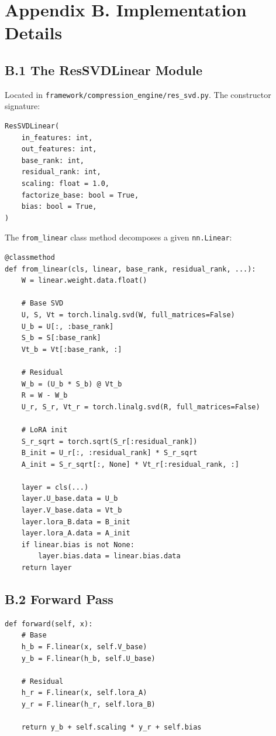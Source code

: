 \section{Appendix B. Implementation Details}

\subsection{B.1 The ResSVDLinear Module}

Located in \texttt{framework/compression\_engine/res\_svd.py}. The constructor 
signature:

\begin{lstlisting}
ResSVDLinear(
    in_features: int,
    out_features: int,
    base_rank: int,
    residual_rank: int,
    scaling: float = 1.0,
    factorize_base: bool = True,
    bias: bool = True,
)
\end{lstlisting}

The \texttt{from\_linear} class method decomposes a given \texttt{nn.Linear}:

\begin{lstlisting}
@classmethod
def from_linear(cls, linear, base_rank, residual_rank, ...):
    W = linear.weight.data.float()
    
    # Base SVD
    U, S, Vt = torch.linalg.svd(W, full_matrices=False)
    U_b = U[:, :base_rank]
    S_b = S[:base_rank]
    Vt_b = Vt[:base_rank, :]
    
    # Residual
    W_b = (U_b * S_b) @ Vt_b
    R = W - W_b
    U_r, S_r, Vt_r = torch.linalg.svd(R, full_matrices=False)
    
    # LoRA init
    S_r_sqrt = torch.sqrt(S_r[:residual_rank])
    B_init = U_r[:, :residual_rank] * S_r_sqrt
    A_init = S_r_sqrt[:, None] * Vt_r[:residual_rank, :]
    
    layer = cls(...)
    layer.U_base.data = U_b
    layer.V_base.data = Vt_b
    layer.lora_B.data = B_init
    layer.lora_A.data = A_init
    if linear.bias is not None:
        layer.bias.data = linear.bias.data
    return layer
\end{lstlisting}

\subsection{B.2 Forward Pass}

\begin{lstlisting}
def forward(self, x):
    # Base
    h_b = F.linear(x, self.V_base)
    y_b = F.linear(h_b, self.U_base)
    
    # Residual
    h_r = F.linear(x, self.lora_A)
    y_r = F.linear(h_r, self.lora_B)
    
    return y_b + self.scaling * y_r + self.bias
\end{lstlisting}

